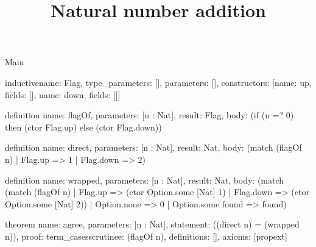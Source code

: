 \begin{lexlean}{Main}
\title{Natural number addition}
\begin{semanticmodule}
inductive{name: Flag, type_parameters: [], parameters: [], constructors: [{name: up, fields: []}, {name: down, fields: []}]}

definition{
  name: flagOf,
  parameters: [n : Nat],
  result: Flag,
  body: (if (n =? 0) then (ctor Flag.up) else (ctor Flag.down))
}

definition{
  name: direct,
  parameters: [n : Nat],
  result: Nat,
  body: (match (flagOf n)
    | Flag.up => 1
    | Flag.down => 2)
}

definition{
  name: wrapped,
  parameters: [n : Nat],
  result: Nat,
  body: (match (match (flagOf n)
    | Flag.up => (ctor Option.some [Nat] 1)
    | Flag.down => (ctor Option.some [Nat] 2))
    | Option.none => 0
    | Option.some found => found)
}

theorem{
  name: agree,
  parameters: [n : Nat],
  statement: ((direct n) = (wrapped n)),
  proof: term_cases{scrutinee: (flagOf n), definitions: []},
  axioms: [propext]
}
\end{semanticmodule}
\end{lexlean}

